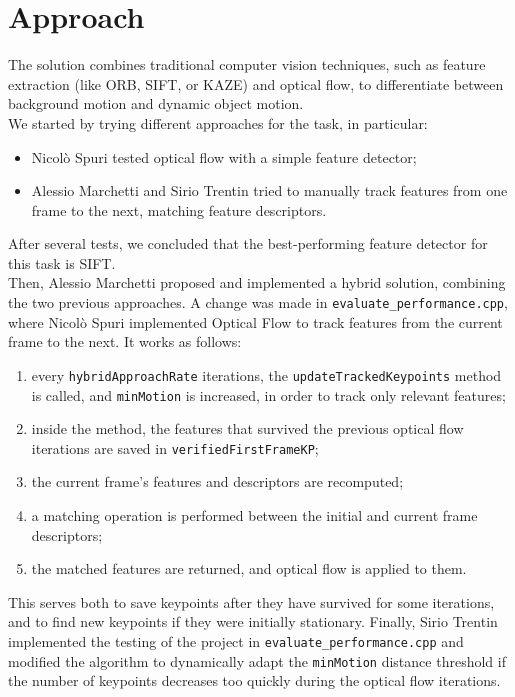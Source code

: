 \documentclass[a4paper,11pt]{article}
\begin{document}
\section{Approach}
The solution combines traditional computer vision techniques, such as feature extraction (like ORB, SIFT, or KAZE) and optical flow, to differentiate between background motion and dynamic object motion. \\
We started by trying different approaches for the task, in particular: 
\begin{itemize}
    \item Nicolò Spuri tested optical flow with a simple feature detector;
    \item Alessio Marchetti and Sirio Trentin tried to manually track features from one frame to the next, matching feature descriptors.
\end{itemize}
After several tests, we concluded that the best-performing feature detector for this task is SIFT. \\
Then, Alessio Marchetti proposed and implemented a hybrid solution, combining the two previous approaches. A change was made in \texttt{evaluate\_performance.cpp}, where Nicolò Spuri implemented Optical Flow to track features from the current frame to the next. It works as follows:
\begin{enumerate}
    \item every \texttt{hybridApproachRate} iterations, the \texttt{updateTrackedKeypoints} method is called, and \texttt{minMotion} is increased, in order to track only relevant features;
    \item inside the method, the features that survived the previous optical flow iterations are saved in \texttt{verifiedFirstFrameKP};
    \item the current frame's features and descriptors are recomputed;
    \item a matching operation is performed between the initial and current frame descriptors;
    \item the matched features are returned, and optical flow is applied to them.
\end{enumerate}
This serves both to save keypoints after they have survived for some iterations, and to find new keypoints if they were initially stationary.
Finally, Sirio Trentin implemented the testing of the project in \texttt{evaluate\_performance.cpp} and modified the algorithm to dynamically adapt the \texttt{minMotion} distance threshold if the number of keypoints decreases too quickly during the optical flow iterations.\\
\end{document}
